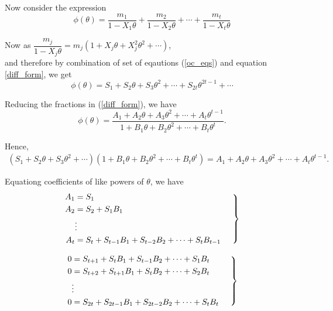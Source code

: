 \documentclass[../main.tex]{subfiles}
\begin{document}
Now consider the expression
\begin{equation}\label{diff_form}
	\phi(\theta) = \dfrac{m_1}{1-X_1\theta} + \dfrac{m_2}{1-X_2\theta} + \cdots + \dfrac{m_t}{1-X_t\theta} 
\end{equation}

Now as $\dfrac{m_j}{1-X_j\theta} = m_j(1 + X_j\theta + X_j^2 \theta^2 + \cdots)$,\\
and therefore by combination of set of eqautions (\ref{oc_eqs}) and equation \ref{diff_form}, we get
\begin{equation}\label{synd_form}
	\phi(\theta) = S_1 + S_2\theta + S_3\theta^2 + \cdots + S_{2t}\theta^{2t-1} + \cdots
\end{equation}

Reducing the fractions in (\ref{diff_form}), we have
\begin{equation}\label{mixed_form}
	\phi(\theta) = \dfrac{A_1 + A_2\theta + A_3\theta^2 + \cdots + A_t\theta^{t-1}} {1 + B_1\theta + B_2\theta^2 + \cdots + B_t\theta^t}.
\end{equation}

Hence,
\begin{multline*}
	(S_1 + S_2\theta + S_3\theta^2 + \cdots)(1 + B_1\theta + B_2\theta^2 + \cdots + B_t\theta^t) = A_1 + A_2\theta + A_3\theta^2 + \cdots + A_t\theta^{t-1}.
\end{multline*}

Equationg coefficients of like powers of $\theta$, we have
\begin{equation}\label{both_AnB}
	\left.	
	\begin{split}		
		A_1 &= S_1 \\		
		A_2 &= S_2 + S_1B_1 \\
		& \vdots \\
		A_t &= S_t + S_{t-1}B_1 + S_{t-2}B_2 + \cdots + S_tB_{t-1}			
	\end{split}
	\hspace{5mm}
	\right\}
\end{equation}

\begin{equation}\label{only_B}
	\left.	
	\begin{split}		
		0 &= S_{t+1} + S_{t}B_1 + S_{t-1}B_2 + \cdots + S_1B_{t} \\		
		0 &= S_{t+2} + S_{t+1}B_1 + S_{t}B_2 + \cdots + S_2B_{t} \\
		& \vdots \\
		0 &= S_{2t} + S_{2t-1}B_1 + S_{2t-2}B_2 + \cdots + S_tB_{t}			
	\end{split}
	\hspace{5mm}
	\right\}
\end{equation} 
\end{document}
